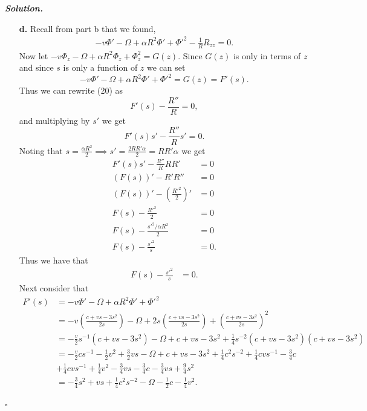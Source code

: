 \documentclass[12pt]{report}
\newenvironment{solution}[1][\it{Solution}]{\textbf{#1. } }{$\square$}
\newcommand{\paren}[1]{{\left(#1\right)}} %
\begin{document}
\begin{solution}
\begin{enumerate}
        \item[{\bf d.}]
        Recall from part b that we found,
        \begin{align}
            -v\Phi' - \Omega + \alpha R^2\Phi' + \Phi'^2 - \frac{1}{R}R_{zz} = 0.
        \end{align}
        Now let $-v\Phi_z - \Omega + \alpha R^2\Phi_z + \Phi_z^2 = G(z)$. Since $G(z)$ is only in terms of $z$ and since $s$ is only a function of $z$ we can set
        \[
            -v\Phi' - \Omega + \alpha R^2\Phi' + \Phi'^2 = G(z) = F'(s).
        \]
        Thus we can rewrite (20) as
        \[
            F'(s) - \frac{R''}{R} = 0,
        \]        
        and multiplying by $s'$ we get
        \[
            F'(s)s' - \frac{R''}{R}s' = 0.
        \]
        Noting that $s = \frac{\alpha R^2}{2} \implies s'=\frac{2RR'\alpha}{2} = RR'\alpha$ we get 
        \begin{align*}
            F'(s)s' - \frac{R''}{R}RR' &= 0\\
            (F(s))' - R'R'' &= 0\\
            (F(s))' - \paren{\frac{R'^2}{2}}' &= 0\\
            F(s) - \frac{R'^2}{2} &= 0\\
            F(s) - \frac{s'^2/\alpha R^2}{2} &= 0\\
            F(s) - \frac{s'^2}{s} &= 0.
        \end{align*}
        Thus we have that
        \begin{align}
            F(s) - \frac{s'^2}{s} &= 0.
        \end{align}
        Next consider that
        \begin{align*}
            F'(s) &= -v\Phi' - \Omega + \alpha R^2\Phi' + \Phi'^2\\
            &= -v \paren{\frac{c + vs - 3s^2}{2s}} - \Omega + 2s\paren{\frac{c + vs - 3s^2}{2s}} + \paren{\frac{c + vs - 3s^2}{2s}}^2\\
            &= -\frac{v}{2}s^{-1}\paren{c + vs - 3s^2} - \Omega + c + vs - 3s^2 + \frac{1}{4}s^{-2}\paren{c + vs - 3s^2}\paren{c + vs - 3s^2}\\
            &=-\frac{v}{2}cs^{-1} - \frac{1}{2}v^2 + \frac{3}{2}vs - \Omega + c + vs - 3s^2 + \frac{1}{4}c^2s^{-2} + \frac{1}{4}cvs^{-1} - \frac{3}{4}c\\ 
            &+ \frac{1}{4}cvs^{-1} + \frac{1}{4}v^2 - \frac{3}{4}vs - \frac{3}{4}c - \frac{3}{4}vs + \frac{9}{4}s^2\\
            &= -\frac{3}{4}s^2 + vs + \frac{1}{4}c^2s^{-2} - \Omega - \frac{1}{2}c - \frac{1}{4}v^2.

\end{align*}
\end{enumerate}
\end{solution}
\end{document}
